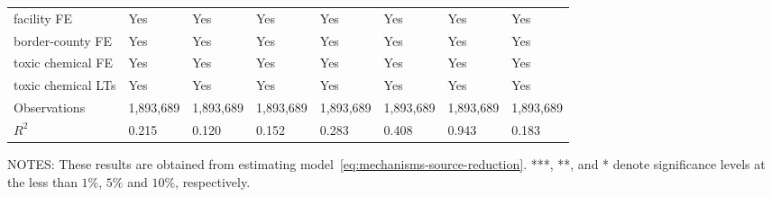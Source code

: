 \begin{table}[H]
{\begin{tabular}{@{}llllllll@{}}
            facility FE        & Yes         & Yes                  & Yes                      & Yes                 & Yes              & Yes       & Yes       \\
            border-county FE   & Yes         & Yes                  & Yes                      & Yes                 & Yes              & Yes       & Yes       \\
            toxic chemical FE  & Yes         & Yes                  & Yes                      & Yes                 & Yes              & Yes       & Yes       \\
            toxic chemical LTs & Yes         & Yes                  & Yes                      & Yes                 & Yes              & Yes       & Yes       \\ \midrule
            Observations       & 1,893,689   & 1,893,689            & 1,893,689                & 1,893,689           & 1,893,689        & 1,893,689 & 1,893,689 \\
            $R^2$              & 0.215       & 0.120                & 0.152                    & 0.283               & 0.408            & 0.943     & 0.183     \\ \bottomrule\bottomrule
        \end{tabular}%
    }
    \begin{minipage}{14cm}
        \vspace{0.05in}
        NOTES: These results are obtained from estimating model~\ref{eq:mechanisms-source-reduction}. ***, **, and * denote significance levels at the less than $1\%$, $5\%$ and $10\%$, respectively.
    \end{minipage}
\end{table}